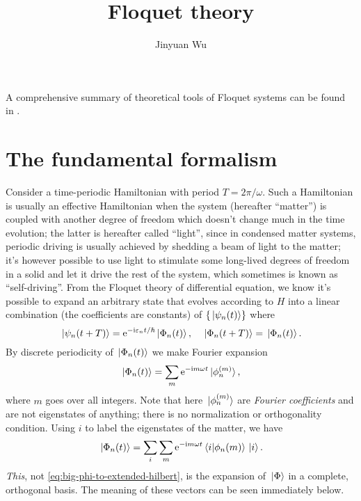 \documentclass[hyperref, a4paper]{article}
\title{Floquet theory}
\author{Jinyuan Wu}
\newcommand*{\ii}{\mathrm{i}}
\newcommand*{\ee}{\mathrm{e}}
\begin{document}
\maketitle

A comprehensive summary of theoretical tools of Floquet systems 
can be found in \cite{rudner2020floquet}.

\section{The fundamental formalism}

Consider a time-periodic Hamiltonian with period $T = 2 \pi / \omega$.
Such a Hamiltonian is usually an effective Hamiltonian
when the system (hereafter ``matter'')
is coupled with another degree of freedom
which doesn't change much in the time evolution;
the latter is hereafter called ``light'',
since in condensed matter systems, 
periodic driving is usually achieved by 
shedding a beam of light to the matter; 
it's however possible to use light to stimulate 
some long-lived degrees of freedom in a solid 
and let it drive the rest of the system, 
which sometimes is known as ``self-driving''.
From the Floquet theory of differential equation, 
we know it's possible to expand an arbitrary state that 
evolves according to $H$ into 
a linear combination (the coefficients are constants) of 
$\{\ket*{\psi_n(t)}\}$ where 
\begin{equation}
    \ket*{\psi_n (t + T)} = \ee^{- \ii \varepsilon_n t / \hbar} \ket*{\Phi_n(t)},
    \quad \ket*{\Phi_n(t + T)} = \ket*{\Phi_n(t)}.
    \label{eq:floquet-wave-function}
\end{equation}
By discrete periodicity of $\ket*{\Phi_n(t)}$ we make Fourier expansion 
\begin{equation}
    \ket*{\Phi_n(t)} = \sum_m \ee^{- \ii m \omega t} \ket*{\phi_n^{(m)}},
    \label{eq:big-phi-to-extended-hilbert}
\end{equation}
where $m$ goes over all integers.
Note that here $\ket*{\phi_n^{(m)}}$
are \emph{Fourier coefficients} and are not eigenstates of anything; 
there is no normalization or orthogonality condition.
Using $i$ to label the eigenstates of the matter, 
we have 
\begin{equation}
    \ket*{\Phi_n(t)} = \sum_{i} \sum_{m}
    \ee^{- \ii m \omega t} \braket*{i}{\phi_n(m)} \ket*{i}.
\end{equation}
\emph{This}, not \eqref{eq:big-phi-to-extended-hilbert}, 
is the expansion of $\ket*{\Phi}$ in a 
complete, orthogonal basis.
The meaning of these vectors can be seen immediately below.
\end{document}
